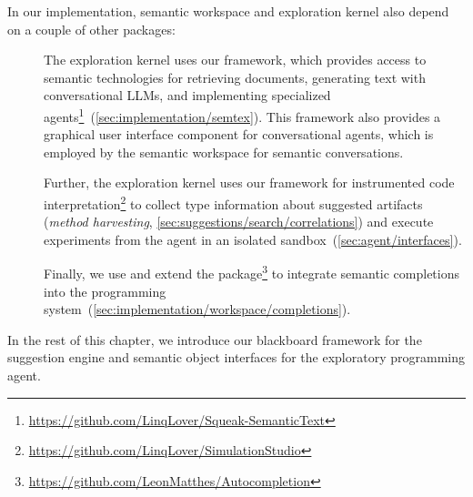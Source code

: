 In our implementation, semantic workspace and exploration kernel also depend on a couple of other packages:

\begin{description}
	\item[]
	The exploration kernel uses our  framework, which provides access to semantic technologies for retrieving documents, generating text with conversational LLMs, and implementing specialized agents\footnote{\url{https://github.com/LinqLover/Squeak-SemanticText}}~(\cref{sec:implementation/semtex}).
	This framework also provides a graphical user interface component for conversational agents, which is employed by the semantic workspace for semantic conversations.

	\item[]
	Further, the exploration kernel uses our  framework for instrumented code interpretation\footnote{\url{https://github.com/LinqLover/SimulationStudio}} to collect type information about suggested artifacts (\emph{method harvesting}, \cref{sec:suggestions/search/correlations}) and execute experiments from the agent in an isolated sandbox~(\cref{sec:agent/interfaces}). %

	\item[]
	Finally, we use and extend the  package\footnote{\url{https://github.com/LeonMatthes/Autocompletion}} to integrate semantic completions into the programming system~(\cref{sec:implementation/workspace/completions}).
\end{description}

In the rest of this chapter, we introduce our blackboard framework for the suggestion engine and semantic object interfaces for the exploratory programming agent.

